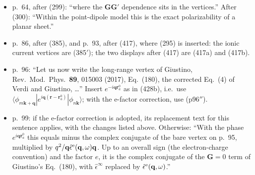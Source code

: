 \begin{itemize}
\item p.~64, after (299): ``where the $\mathbf G\mathbf G'$ dependence sits in the vertices.'' After (300): ``Within the point-dipole model this is the exact polarizability of a planar sheet.''
\item p.~86, after (385), and p.~93, after (417), where (295) is inserted: the ionic current vertices are (385$'$); the two displays after (417) are (417a) and (417b).
\item p.~96: ``Let us now write the long-range vertex of Giustino, Rev.\ Mod.\ Phys.\ \textbf{89}, 015003 (2017), Eq.~(180), the corrected Eq.~(4) of Verdi and Giustino, \dots'' Insert $e^{-i\mathbf q\mathbf r^0_a}$ as in (428b), i.e.\ use $\langle\phi_{m\mathbf k+\mathbf q}|e^{i\mathbf q(\mathbf r-\mathbf r^0_a)}|\phi_{n\mathbf k}\rangle$; with the e-factor correction, use (p96$''$).
\item p.~99: if the e-factor correction is adopted, its replacement text for this sentence applies, with the changes listed above. Otherwise: ``With the phase $e^{i\mathbf q\mathbf r^0_a}$ this equals minus the complex conjugate of the bare vertex on p.~95, multiplied by $q^2/\mathbf q\hat\epsilon^{\rm e}(\mathbf q,\omega)\mathbf q$. Up to an overall sign (the electron-charge convention) and the factor $e$, it is the complex conjugate of the $\mathbf G=0$ term of Giustino's Eq.~(180), with $\hat\epsilon^\infty$ replaced by $\hat\epsilon^{\rm e}(\mathbf q,\omega)$.''
\end{itemize}

